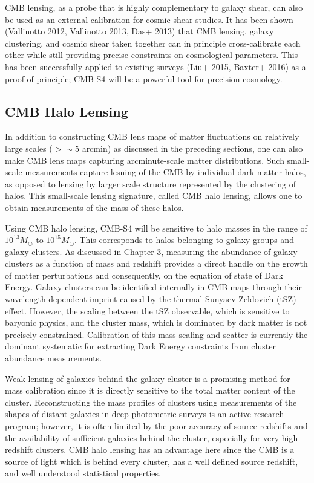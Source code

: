 CMB lensing, as a probe that is highly complementary to galaxy shear, can also be used as an external calibration for cosmic shear studies. It has been shown 
(Vallinotto 2012, Vallinotto 2013, Das+ 2013) that CMB lensing, galaxy clustering, and cosmic shear taken together can in principle cross-calibrate each other while still providing precise constraints on cosmological parameters. This has been successfully applied to existing surveys (Liu+ 2015, Baxter+ 2016)
as a proof of principle; CMB-S4 will be a powerful tool for precision
cosmology.

\subsection{CMB Halo Lensing}\label{haloLensing}

In addition to constructing CMB lens maps of matter fluctuations on relatively large scales ($> \sim 5$ arcmin) as discussed in the preceding sections, one can also make CMB lens maps capturing arcminute-scale matter distributions. Such small-scale measurements capture lesning of the CMB by individual dark matter halos, as opposed to lensing by larger scale structure represented by the clustering of halos.  This small-scale lensing signature, called CMB halo lensing, allows one to obtain measurements of the mass of these halos.  

Using CMB halo lensing, CMB-S4 will be sensitive to halo masses in the range of $10^{13} M_{\odot}$ to $10^{15} M_{\odot}$.  This corresponds to halos belonging to galaxy groups and galaxy clusters.  As discussed in Chapter 3, measuring the abundance of galaxy clusters as a function of mass and redshift provides a direct handle on the growth of matter perturbations and consequently, on the equation of state of Dark Energy.  Galaxy clusters can be identified internally in CMB maps through their wavelength-dependent imprint caused by the thermal Sunyaev-Zeldovich (tSZ) effect. However, the scaling between the tSZ observable, which is sensitive to baryonic physics, and the cluster mass, which is dominated by dark matter is not precisely constrained.  Calibration of this mass scaling and scatter is currently the dominant systematic for extracting Dark Energy constraints from cluster abundance measurements. 

Weak lensing of galaxies behind the galaxy cluster is a promising method for mass calibration since it is directly sensitive to the total matter content of the cluster.  Reconstructing the mass profiles of clusters using measurements of the shapes of distant galaxies in deep photometric surveys is an active research program; however, it is often limited by the poor accuracy of source redshifts and the availability of sufficient galaxies behind the cluster, especially for very high-redshift clusters. CMB halo lensing has an advantage here since the CMB is a source of light which is behind every cluster, has a well defined source redshift, and well understood statistical properties.  

